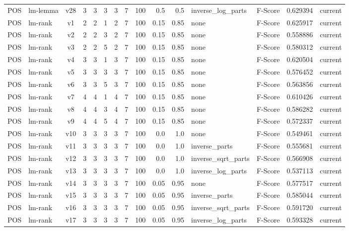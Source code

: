 \documentclass{article}
\begin{document}
\begin{xltabular}{\linewidth}{@{}lYcrrrrrrrrYlrl@{}}
POS & lm-lemma & v28 & 3 & 3 & 3 & 3 & 7 & 100 & 0.5 & 0.5 & inverse\_log\_parts & F-Score & 0.629394 & current \\
POS & lm-rank & v1 & 2 & 2 & 1 & 2 & 7 & 100 & 0.15 & 0.85 & none & F-Score & 0.625917 & current \\
POS & lm-rank & v2 & 2 & 2 & 3 & 2 & 7 & 100 & 0.15 & 0.85 & none & F-Score & 0.558886 & current \\
POS & lm-rank & v3 & 2 & 2 & 5 & 2 & 7 & 100 & 0.15 & 0.85 & none & F-Score & 0.580312 & current \\
POS & lm-rank & v4 & 3 & 3 & 1 & 3 & 7 & 100 & 0.15 & 0.85 & none & F-Score & 0.620504 & current \\
POS & lm-rank & v5 & 3 & 3 & 3 & 3 & 7 & 100 & 0.15 & 0.85 & none & F-Score & 0.576452 & current \\
POS & lm-rank & v6 & 3 & 3 & 5 & 3 & 7 & 100 & 0.15 & 0.85 & none & F-Score & 0.563856 & current \\
POS & lm-rank & v7 & 4 & 4 & 1 & 4 & 7 & 100 & 0.15 & 0.85 & none & F-Score & 0.610426 & current \\
POS & lm-rank & v8 & 4 & 4 & 3 & 4 & 7 & 100 & 0.15 & 0.85 & none & F-Score & 0.586282 & current \\
POS & lm-rank & v9 & 4 & 4 & 5 & 4 & 7 & 100 & 0.15 & 0.85 & none & F-Score & 0.572337 & current \\
POS & lm-rank & v10 & 3 & 3 & 3 & 3 & 7 & 100 & 0.0 & 1.0 & none & F-Score & 0.549461 & current \\
POS & lm-rank & v11 & 3 & 3 & 3 & 3 & 7 & 100 & 0.0 & 1.0 & inverse\_parts & F-Score & 0.555681 & current \\
POS & lm-rank & v12 & 3 & 3 & 3 & 3 & 7 & 100 & 0.0 & 1.0 & inverse\_sqrt\_parts & F-Score & 0.566908 & current \\
POS & lm-rank & v13 & 3 & 3 & 3 & 3 & 7 & 100 & 0.0 & 1.0 & inverse\_log\_parts & F-Score & 0.537113 & current \\
POS & lm-rank & v14 & 3 & 3 & 3 & 3 & 7 & 100 & 0.05 & 0.95 & none & F-Score & 0.577517 & current \\
POS & lm-rank & v15 & 3 & 3 & 3 & 3 & 7 & 100 & 0.05 & 0.95 & inverse\_parts & F-Score & 0.585044 & current \\
POS & lm-rank & v16 & 3 & 3 & 3 & 3 & 7 & 100 & 0.05 & 0.95 & inverse\_sqrt\_parts & F-Score & 0.591720 & current \\
POS & lm-rank & v17 & 3 & 3 & 3 & 3 & 7 & 100 & 0.05 & 0.95 & inverse\_log\_parts & F-Score & 0.593328 & current \\

\end{xltabular}
\end{document}
